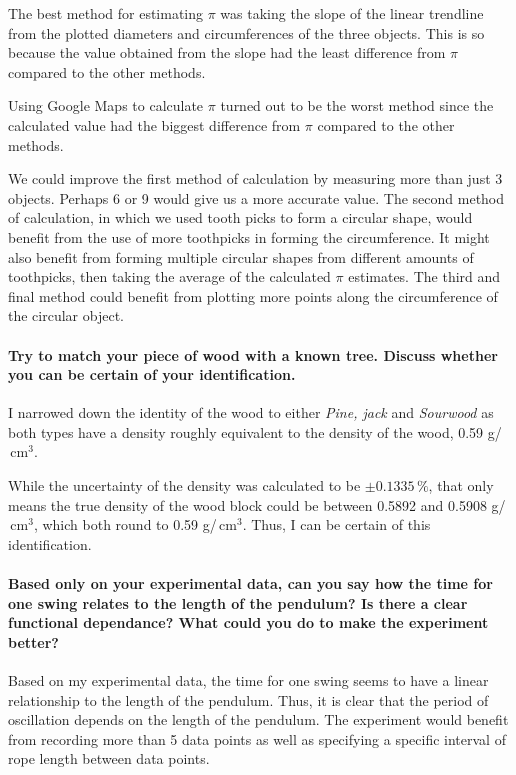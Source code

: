 \documentclass{article}
\begin{document}
The best method for estimating $\pi$ was taking the slope of 
the linear trendline from the plotted diameters and circumferences 
of the three objects. This is so because the value obtained from the
slope had the least difference from $\pi$ compared to the other methods.

Using Google Maps to calculate $\pi$ turned out to be the worst method 
since the calculated value had the biggest difference from $\pi$ compared 
to the other methods.

We could improve the first method of calculation by measuring more than just 
3 objects. Perhaps 6 or 9 would give us a more accurate value. The second method
of calculation, in which we used tooth picks to form a circular shape, would benefit 
from the use of more toothpicks in forming the circumference. It might also benefit 
from forming multiple circular shapes from different amounts of toothpicks, then taking 
the average of the calculated $\pi$ estimates. The third and final method could benefit 
from plotting more points along the circumference of the circular object. 

\paragraph*{\numberQ Try to match your piece of wood with a known 
tree. Discuss whether you can be certain of your 
identification.}
I narrowed down the identity of the wood to either \emph{Pine, jack} and \emph{Sourwood} 
as both types have a density roughly equivalent to the density of the wood, 
0.59 g/$\,\mathrm{cm}^3$. 

While the uncertainty of the density was calculated to be $\pm0.1335\,\%$, that only means 
the true density of the wood block could be between 0.5892 and 0.5908 g/$\,\mathrm{cm}^3$,
which both round to 0.59 g/$\,\mathrm{cm}^3$. Thus, I can be certain of this identification.


\paragraph*{\numberQ Based only on your experimental data, can you 
say how the time for one swing relates to the length 
of the pendulum? Is there a clear functional 
dependance? What could you do to make the experiment better?}
Based on my experimental data, the time for one swing seems to have a 
linear relationship to the length of the pendulum. Thus, it is clear that
the period of oscillation depends on the length of the pendulum. The experiment 
would benefit from recording more than 5 data points as well as specifying a specific 
interval of rope length between data points.
\end{document}
